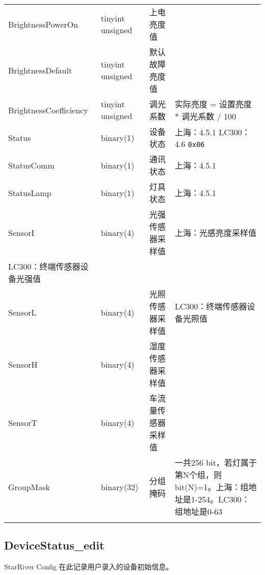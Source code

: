 \begin{longtabu}[c]{@{}lXXX@{}}
\\\addlinespace
BrightnessPowerOn & tinyint unsigned & 上电亮度值 &
\\\addlinespace
BrightnessDefault & tinyint unsigned & 默认故障亮度值 &
\\\addlinespace
BrightnessCoefficiency & tinyint unsigned & 调光系数 & 实际亮度 =
设置亮度 * 调光系数 / 100
\\\addlinespace
Status & binary(1) & 设备状态 & 上海：4.5.1 LC300：4.6 \texttt{0x06}
\\\addlinespace
StatusComm & binary(1) & 通讯状态 & 上海：4.5.1
\\\addlinespace
StatusLamp & binary(1) & 灯具状态 & 上海：4.5.1
\\\addlinespace
SensorI & binary(4) & 光强传感器采样值 & 上海：光感亮度采样值
\\\addlinespace
LC300：终端传感器设备光强值
\\\addlinespace
SensorL & binary(4) & 光照传感器采样值 & LC300：终端传感器设备光照值
\\\addlinespace
SensorH & binary(4) & 湿度传感器采样值 &
\\\addlinespace
SensorT & binary(4) & 车流量传感器采样值 &
\\\addlinespace
GroupMask & binary(32) & 分组掩码 & 一共256
bit，若灯属于第N个组，则bit(N)=1。上海：组地址是1-254。LC300：组地址是0-63
\\\addlinespace
\bottomrule
\end{longtabu}

\subsection{DeviceStatus\_edit}\label{devicestatusux5fedit}

StarRiver Config 在此记录用户录入的设备初始信息。

